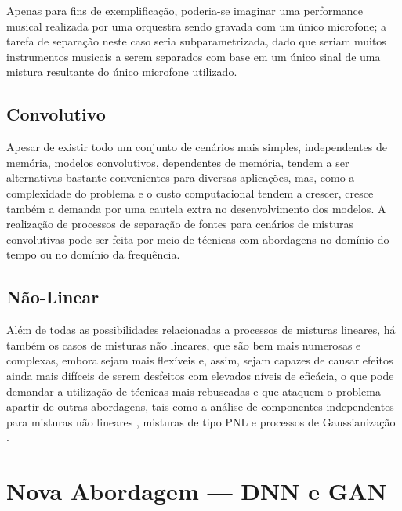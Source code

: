 Apenas para fins de exemplificação, poderia-se imaginar uma performance musical realizada por uma orquestra sendo gravada com um único microfone; a tarefa de separação neste caso seria subparametrizada, dado que seriam muitos instrumentos musicais a serem separados com base em um único sinal de uma mistura resultante do único microfone utilizado.




\subsection{Convolutivo}
\label{subsec:intro_convolutive}

Apesar de existir todo um conjunto de cenários mais simples, independentes de memória, modelos convolutivos, dependentes de memória, tendem a ser alternativas bastante convenientes para diversas aplicações, mas, como a complexidade do problema e o custo computacional tendem a crescer, cresce também a demanda por uma cautela extra no desenvolvimento dos modelos. A realização de processos de separação de fontes para cenários de misturas convolutivas pode ser feita por meio de técnicas com abordagens no domínio do tempo ou no domínio da frequência.




\subsection{Não-Linear}
\label{subsec:intro_non-linear}

Além de todas as possibilidades relacionadas a processos de misturas lineares, há também os casos de misturas não lineares, que são bem mais numerosas e complexas, embora sejam mais flexíveis e, assim, sejam capazes de causar efeitos ainda mais difíceis de serem desfeitos com elevados níveis de eficácia, o que pode demandar a utilização de técnicas mais rebuscadas e que ataquem o problema apartir de outras abordagens, tais como a análise de componentes independentes para misturas não lineares \citep{hyvarinen1999nonlinear}, misturas de tipo PNL \citep{taleb1999source} e processos de Gaussianização \citep{sole2003improving, ziehe2003blind}.



\section{Nova Abordagem --- DNN e GAN}
\label{sec:intro_new_approach}


